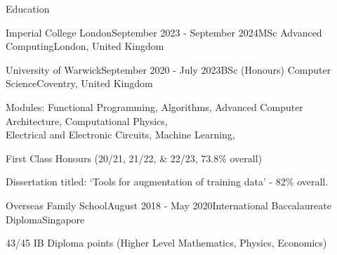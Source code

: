 \documentclass{resume}
\begin{document}
    \begin{rSection}{Education}
        \begin{rSubsection}{Imperial College London}{September 2023 - September 2024}{MSc Advanced Computing}{London, United Kingdom}{}
            \item 
        \end{rSubsection}
        \begin{rSubsection}{University of Warwick}{September 2020 - July 2023}{BSc (Honours) Computer Science}{Coventry, United Kingdom}{}
        \item Modules: Functional Programming, Algorithms, Advanced Computer Architecture, Computational Physics, \\Electrical and Electronic Circuits, Machine Learning, 
        \item First Class Honours (20/21, 21/22, \& 22/23, 73.8\% overall)
        \item Dissertation titled: `Tools for augmentation of training data' - 82\% overall.
        \end{rSubsection}
        \begin{rSubsection}{Overseas Family School}{August 2018 - May 2020}{International Baccalaureate Diploma}{Singapore}{}
        \item 43/45 IB Diploma points (Higher Level Mathematics, Physics, Economics)
        \end{rSubsection}
    \end{rSection} 
\end{document}
